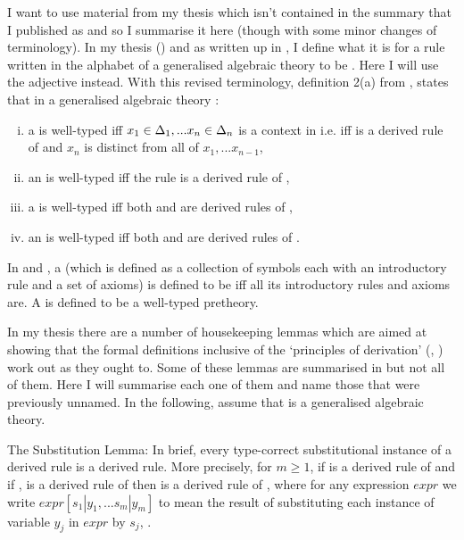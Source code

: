 
\note I want to use material from my thesis  \cite{Cartmell78} which isn't contained in
the summary that I  published as \cite{Cartmell86} and so I summarise it here (though with some minor changes of
terminology).
\note 
In my thesis (\cite{Cartmell78}) and as written up in \cite{Cartmell86}, I define what it is for a rule written in the alphabet of a generalised algebraic theory to be . Here I will use the adjective  instead.
With this revised terminology, definition 2(a) from \cite{Cartmell86}, states that in  a generalised algebraic theory \gatUw:
\begin{enumerate} [(i)]
\item 
a \Trule {} is well-typed  iff 
$x_1 \in \Delta_1,... x_{n} \in \Delta_{n}$ is a context in \gatUw i.e. iff 
 is a derived rule of \gatUw and $x_n$ is distinct from all of $x_1,...x_{n-1}$, 
\item 
an \trule {} is well-typed iff
the rule  is a derived rule of \gatU,
\item 
a \Teqrule {} is well-typed iff
both  and  are derived rules
of \gatU,
\item 
an \teqrule {} is well-typed iff
both  and  are derived rules
of \gatU.
\end{enumerate}
In \cite{Cartmell78} and \cite{Cartmell86}, a  (which is defined as a collection of symbols each with an introductory rule and a set of axioms) is defined to be  iff all its introductory rules and axioms are. A  is defined to be a well-typed pretheory.

\note In my thesis there are a number of housekeeping lemmas which are aimed at showing that the formal definitions inclusive of the `principles of derivation' (\cite{Cartmell78}, \cite{Cartmell86}) work out as they ought to. Some of these lemmas are summarised in \cite{Cartmell86} but not all of them. Here I will summarise each one of them and name those that were previously unnamed. In the following, assume that \gatUw is a generalised algebraic theory.

\note The Substitution Lemma: In brief, every type-correct substitutional instance of a derived rule is a derived rule. More precisely, for $m \geq 1$, if  is a derived rule of \gatUw 
and if  \foreachj,  is a derived rule of \gatUw
then  is a derived rule of \gatU, where
for any expression $expr$ we write
$expr[s_1|y_1,...s_m|y_m]$ to mean
the result of substituting each instance of variable $y_j$ in $expr$ by $s_j$, \foreachj.

